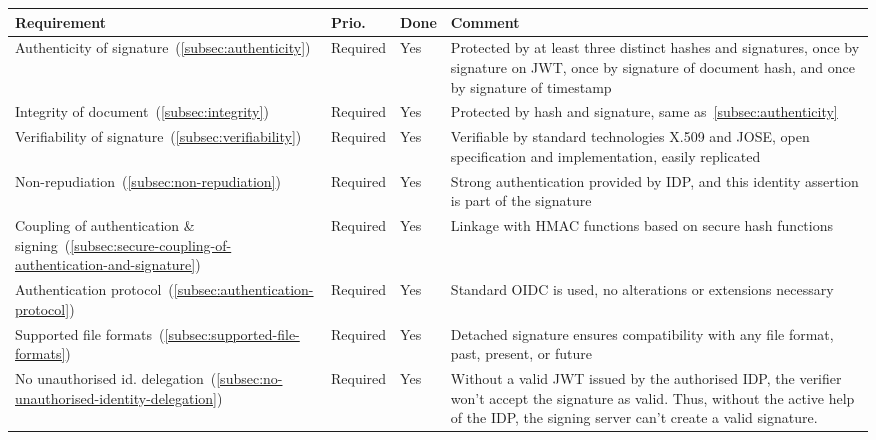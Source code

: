 \begin{center}
    \begin{longtable}{p{4.0cm}|p{1.35cm}|p{0.7cm}|p{9.0cm}}
        \textbf{Requirement} & \textbf{Prio.} & \textbf{Done} & \textbf{Comment}
        \\
        \hline
        Authenticity of signature~(\ref{subsec:authenticity})
        & Required
        & Yes
        & Protected by at least three distinct hashes and signatures,
        once by signature on \gls{JWT},
        once by signature of document hash,
        and once by signature of timestamp
        \\
        \hline
        Integrity of document~(\ref{subsec:integrity})
        & Required
        & Yes
        & Protected by hash and signature, same as~\ref{subsec:authenticity}
        \\
        \hline
        Verifiability of signature~(\ref{subsec:verifiability})
        & Required
        & Yes
        & Verifiable by standard technologies X.509 and \gls{JOSE},
        open specification and implementation,
        easily replicated
        \\
        \hline
        Non-repudiation~(\ref{subsec:non-repudiation})
        & Required
        & Yes
        & Strong authentication provided by \gls{IDP},
        and this identity assertion is part of the signature
        \\
        \hline
        Coupling of authentication \& signing~(\ref{subsec:secure-coupling-of-authentication-and-signature})
        & Required
        & Yes
        & Linkage with \gls{HMAC} functions based on secure hash functions
        \\
        \hline
        Authentication protocol~(\ref{subsec:authentication-protocol})
        & Required
        & Yes
        & Standard \gls{OIDC} is used, no alterations or extensions necessary
        \\
        \hline
        Supported file formats~(\ref{subsec:supported-file-formats})
        & Required
        & Yes
        & Detached signature ensures compatibility with any file format, past, present, or future
        \\ \hline
        No unauthorised id. delegation~(\ref{subsec:no-unauthorised-identity-delegation})
        & Required
        & Yes
        & Without a valid \gls{JWT} issued by the authorised \gls{IDP},
        the verifier won't accept the signature as valid.
        Thus, without the active help of the \gls{IDP},
        the signing server can't create a valid signature.

\end{longtable}
\end{center}
